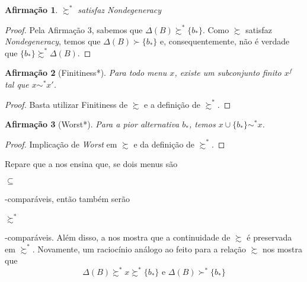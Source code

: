 \documentclass[11pt, a4paper]{article}
\theoremstyle{nonumberplain}
\newtheorem{proof}{Dem.}
\theoremstyle{plain}
\theoremstyle{plain}
\newtheorem{claim}{Afirmação}
\theoremstyle{plain}
\theoremstyle{nonumberplain}
\begin{document}
\begin{claim}$\succsim^*$ satisfaz \emph{Nondegeneracy}\end{claim}
\begin{proof}
Pela Afirmação 3, sabemos que $\Delta(B)\succsim^* \{b_*\}$. Como $\succsim$ satisfaz \emph{Nondegeneracy}, temos que $\Delta(B)\succ \{b_*\}$ e, consequentemente, não é verdade que $\{b_*\}\succsim^*\Delta(B)$.
\end{proof}
\begin{claim}[Finitiness*]Para todo menu $x$, existe um subconjunto finito $x^f$ tal que $x\sim^* x'$.\end{claim}
\begin{proof}
Basta utilizar Finitiness de $\succsim$ e a definição de $\succsim^*$.
\end{proof}
\begin{claim}[Worst*] Para a pior alternativa $b_*$, temos $x\cup\{b_*\}\sim^* x$.\end{claim}
\begin{proof}
Implicação de \textit{Worst} em $\succsim$ e da definição de $\succsim^*$.
\end{proof}
Repare que a  nos ensina que, se dois menus são \begin{small}$\subseteq$\end{small}-comparáveis, então também serão \begin{small}$\succsim^*$\end{small}-comparáveis. Além disso, a  nos mostra que a continuidade de $\succsim$ é preservada em $\succsim^*$. Novamente, um raciocínio análogo ao feito para a relação $\succsim$ nos mostra que \[\Delta(B)\succsim^* x\succsim^* \{b_*\} \text{ e } \Delta(B)\succ^* \{b_*\}\]
\end{document}
